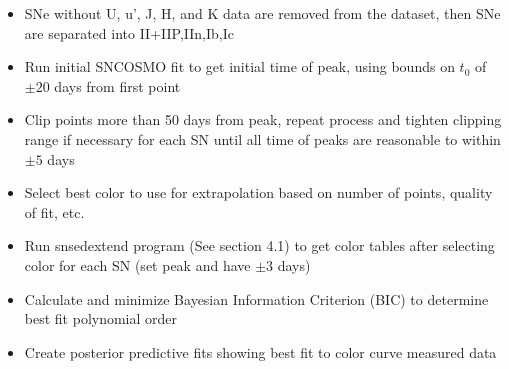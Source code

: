 \begin{itemize}
	\item SNe without U, u', J, H, and K data are removed from the dataset, then SNe are separated into II+IIP,IIn,Ib,Ic
	\item Run initial SNCOSMO fit to get initial time of peak, using bounds on $t_0$ of $\pm20$ days from first point
	\item Clip points more than 50 days from peak, repeat process and tighten clipping range if necessary for each SN until all time of peaks are reasonable to within $\pm 5$ days
	\item Select best color to use for extrapolation based on number of points, quality of fit, etc. 
	\item Run snsedextend program (See section 4.1) to get color tables after selecting color for each SN (set peak and have $\pm3$ days)
	\item Calculate and minimize Bayesian Information Criterion (BIC) to determine best fit polynomial order
	\item Create posterior predictive fits showing best fit to color curve measured data
\end{itemize}

\renewcommand{\labelitemii}{-}


